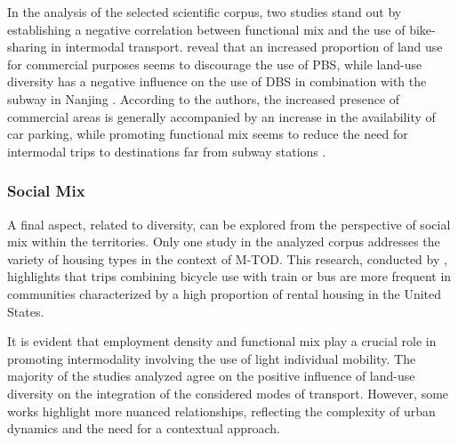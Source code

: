 \begin{refsegment}
In the analysis of the selected scientific corpus, two studies stand out by establishing a negative correlation between functional mix and the use of bike-sharing in intermodal transport. \textcolor{blue}{\textcite[8]{cheng_promoting_2022}} reveal that an increased proportion of land use for commercial purposes seems to discourage the use of \acrshort{PBS}, while land-use diversity has a negative influence on the use of \acrshort{DBS} in combination with the subway in Nanjing \textcolor{blue}{\autocite[10]{cheng_comparison_2023}}. According to the authors, the increased presence of commercial areas is generally accompanied by an increase in the availability of car parking, while promoting functional mix seems to reduce the need for intermodal trips to destinations far from subway stations \textcolor{blue}{\autocite[5]{cheng_comparison_2023}}.%

\subsubsection*{Social Mix
    \label{chap2:mixite-sociale}
    }

A final aspect, related to diversity, can be explored from the perspective of social mix within the territories. Only one study in the analyzed corpus addresses the variety of housing types in the context of \acrshort{M-TOD}. This research, conducted by \textcolor{blue}{\textcite[115]{wang_bicycle-transit_2013}}, highlights that trips combining bicycle use with train or bus are more frequent in communities characterized by a high proportion of rental housing in the United States.%

It is evident that employment density and functional mix play a crucial role in promoting intermodality involving the use of light individual mobility. The majority of the studies analyzed agree on the positive influence of land-use diversity on the integration of the considered modes of transport. However, some works highlight more nuanced relationships, reflecting the complexity of urban dynamics and the need for a contextual approach.%


\end{refsegment}
